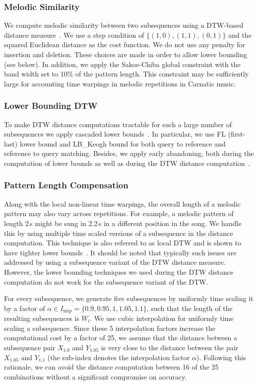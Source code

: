 \subsubsection{Melodic Similarity}
\label{MelodicSimilarity}
We compute melodic similarity between two subsequences using a DTW-based distance measure~\cite{Sakoe78TASLP}. We use a step condition of $\lbrace(1,0), (1,1), (0,1)\rbrace$ and the squared Euclidean distance as the cost function. We do not use any penalty for insertion and deletion. These choices are made in order to allow lower bounding (see below). In addition, we apply the Sakoe-Chiba global constraint with the band width set to 10\% of the pattern length. This constraint may be sufficiently large for accounting time warpings in melodic repetitions in Carnatic music.

\subsubsection{Lower Bounding DTW}
\label{LowerBoundingDTW}
To make DTW distance computations tractable for such a large number of subsequences we apply cascaded lower bounds~\cite{Rakthanmanon2013}. In particular, we use FL (first-last) lower bound and LB\_Keogh bound for both query to reference and reference to query matching. Besides, we apply early abandoning, both during the computation of lower bounds as well as during the DTW distance computation~\cite{Rakthanmanon2013}. 

\subsubsection{Pattern Length Compensation}
\label{PatternLengthCompensation}
Along with the local non-linear time warpings, the overall length of a melodic pattern may also vary across repetitions. For example, a melodic pattern of length 2\,s might be sung in 2.2\,s in a different position in the song. We handle this by using multiple time scaled versions of a subsequence in the distance computation. This technique is also referred to as local DTW and is shown to have tighter lower bounds~\cite{Zhu2003}. It should be noted that typically such issues are addressed by using a subsequence variant of the DTW distance measure. However, the lower bounding techniques we used during the DTW distance computation do not work for the subsequence variant of the DTW. 

For every subsequence, we generate five subsequences by uniformly time scaling it by a factor of $\alpha \in I_{\text{intp}} =\lbrace 0.9, 0.95, 1, 1.05, 1.1\rbrace$, such that the length of the resulting subsequences is $W_l$. We use cubic interpolation for uniformly time scaling a subsequence. Since these 5 interpolation factors increase the computational cost by a factor of 25, we assume that the distance between a subsequence pair $X_{1.0}$ and $Y_{1.05}$ is very close to the distance between the pair $X_{1.05}$ and $Y_{1.1}$ (the sub-index denotes the interpolation factor $\alpha$). Following this rationale, we can avoid the distance computation between 16 of the 25 combinations without a significant compromise on accuracy.

